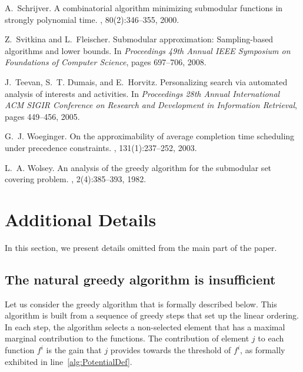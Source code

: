 \documentclass[11pt]{article}
\theoremstyle{plain}
\theoremstyle{definition}
\begin{document}
\begin{thebibliography}{10}
A.~Schrijver.
\newblock A combinatorial algorithm minimizing submodular functions in strongly
  polynomial time.
, 80(2):346--355, 2000.

Z.~Svitkina and L.~Fleischer.
\newblock Submodular approximation: Sampling-based algorithms and lower bounds.
\newblock In {\em Proceedings 49th Annual IEEE Symposium on Foundations of
  Computer Science}, pages 697--706, 2008.

J.~Teevan, S.~T. Dumais, and E.~Horvitz.
\newblock Personalizing search via automated analysis of interests and
  activities.
\newblock In {\em Proceedings 28th Annual International ACM SIGIR Conference on
  Research and Development in Information Retrieval}, pages 449--456, 2005.

G.~J. Woeginger.
\newblock On the approximability of average completion time scheduling under
  precedence constraints.
, 131(1):237--252, 2003.

L.~A. Wolsey.
\newblock An analysis of the greedy algorithm for the submodular set covering
  problem.
, 2(4):385--393, 1982.

\end{thebibliography}


\appendix
\section{Additional Details} \label{appsec:AdditionalDetails}
In this section, we present details omitted from the main part of
the paper.

\subsection{The natural greedy algorithm is insufficient} \label{appsubsec:NonAdaptiveFail}

Let us consider the greedy algorithm that is formally described
below. This algorithm is built from a sequence of greedy steps
that set up the linear ordering. In each step, the algorithm
selects a non-selected element that has a maximal marginal
contribution to the functions. The contribution of element $j$ to
each function $f^i$ is the gain that $j$ provides towards the
threshold of $f^i$, as formally exhibited in
line~\ref{alg:PotentialDef}.
\end{document}
